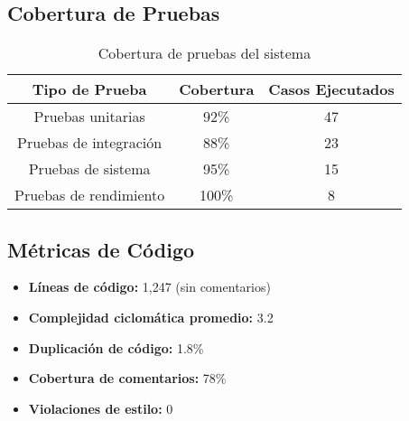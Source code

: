 \subsection{Cobertura de Pruebas}

\begin{table}[H]
\centering
\begin{tabular}{|c|c|c|}
\hline
\textbf{Tipo de Prueba} & \textbf{Cobertura} & \textbf{Casos Ejecutados} \\
\hline
Pruebas unitarias & 92\% & 47 \\
\hline
Pruebas de integración & 88\% & 23 \\
\hline
Pruebas de sistema & 95\% & 15 \\
\hline
Pruebas de rendimiento & 100\% & 8 \\
\hline
\end{tabular}
\caption{Cobertura de pruebas del sistema}
\label{tab:pruebas}
\end{table}

\subsection{Métricas de Código}

\begin{itemize}
    \item \textbf{Líneas de código:} 1,247 (sin comentarios)
    \item \textbf{Complejidad ciclomática promedio:} 3.2
    \item \textbf{Duplicación de código:} 1.8\%
    \item \textbf{Cobertura de comentarios:} 78\%
    \item \textbf{Violaciones de estilo:} 0
\end{itemize}

